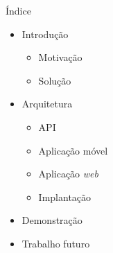 \begin{frame}{Índice}
\vspace*{-7em}
\begin{itemize}
	\item Introdução
	\begin{itemize}
		\item Motivação
		\item Solução
	\end{itemize}
	
	\item Arquitetura
	\begin{itemize}
		\item API
		\item Aplicação móvel
		\item Aplicação \textit{web}
		\item Implantação
	\end{itemize}
	
	\item Demonstração
	
	\item Trabalho futuro
\end{itemize}
\end{frame}